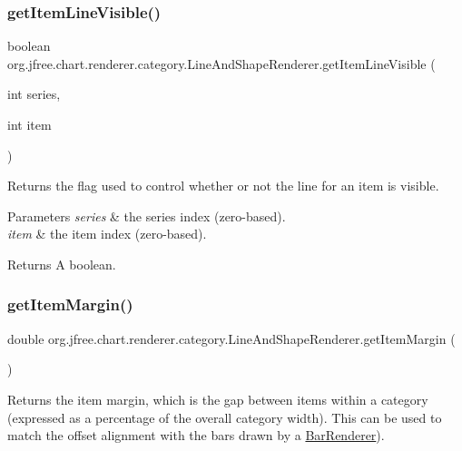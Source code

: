 \subsubsection{\texorpdfstring{get\+Item\+Line\+Visible()}{getItemLineVisible()}}
{\footnotesize\ttfamily boolean org.\+jfree.\+chart.\+renderer.\+category.\+Line\+And\+Shape\+Renderer.\+get\+Item\+Line\+Visible (\begin{DoxyParamCaption}\item[{int}]{series,  }\item[{int}]{item }\end{DoxyParamCaption})}

Returns the flag used to control whether or not the line for an item is visible.


\begin{DoxyParams}{Parameters}
{\em series} & the series index (zero-\/based). \\
\hline
{\em item} & the item index (zero-\/based).\\
\hline
\end{DoxyParams}
\begin{DoxyReturn}{Returns}
A boolean. 
\end{DoxyReturn}
\mbox{\label{classorg_1_1jfree_1_1chart_1_1renderer_1_1category_1_1_line_and_shape_renderer_af16e29caa6c86f32b5bb286b2ddefa3f}} 
\subsubsection{\texorpdfstring{get\+Item\+Margin()}{getItemMargin()}}
{\footnotesize\ttfamily double org.\+jfree.\+chart.\+renderer.\+category.\+Line\+And\+Shape\+Renderer.\+get\+Item\+Margin (\begin{DoxyParamCaption}{ }\end{DoxyParamCaption})}

Returns the item margin, which is the gap between items within a category (expressed as a percentage of the overall category width). This can be used to match the offset alignment with the bars drawn by a \mbox{\hyperlink{classorg_1_1jfree_1_1chart_1_1renderer_1_1category_1_1_bar_renderer}{Bar\+Renderer}}).

